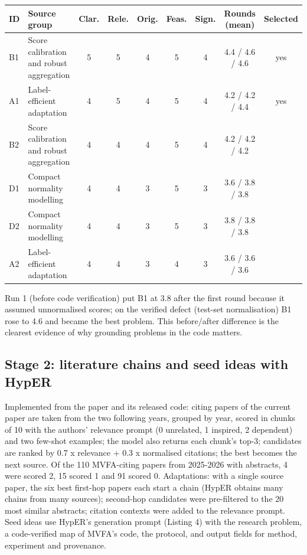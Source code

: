 \documentclass[11pt,a4paper]{article}
\begin{document}
\begin{tabularx}{\linewidth}{@{}l Y ccccc c c@{}}\toprule
ID & Source group & Clar. & Rele. & Orig. & Feas. & Sign. & Rounds (mean) & Selected\\\midrule
B1 & Score calibration and robust aggregation & 5 & 5 & 4 & 5 & 4 & 4.4 / 4.6 / 4.6 & yes\\
A1 & Label-efficient adaptation & 4 & 5 & 4 & 5 & 4 & 4.2 / 4.2 / 4.4 & yes\\
B2 & Score calibration and robust aggregation & 4 & 4 & 4 & 5 & 4 & 4.2 / 4.2 / 4.2 & \\
D1 & Compact normality modelling & 4 & 4 & 3 & 5 & 3 & 3.6 / 3.8 / 3.8 & \\
D2 & Compact normality modelling & 4 & 4 & 3 & 5 & 3 & 3.8 / 3.8 / 3.8 & \\
A2 & Label-efficient adaptation & 4 & 4 & 3 & 4 & 3 & 3.6 / 3.6 / 3.6 & \\
\bottomrule\end{tabularx}

Run 1 (before code verification) put B1 at 3.8 after the first round because it assumed unnormalised scores; on the verified defect (test-set normalisation) B1 rose to 4.6 and became the best problem. This before/after difference is the clearest evidence of why grounding problems in the code matters.
\subsection{Stage 2: literature chains and seed ideas with HypER}
Implemented from the paper and its released code: citing papers of the current paper are taken from the two following years, grouped by year, scored in chunks of 10 with the authors' relevance prompt (0 unrelated, 1 inspired, 2 dependent) and two few-shot examples; the model also returns each chunk's top-3; candidates are ranked by 0.7 x relevance + 0.3 x normalised citations; the best becomes the next source. Of the 110 MVFA-citing papers from 2025-2026 with abstracts, 4 were scored 2, 15 scored 1 and 91 scored 0. Adaptations: with a single source paper, the six best first-hop papers each start a chain (HypER obtains many chains from many sources); second-hop candidates were pre-filtered to the 20 most similar abstracts; citation contexts were added to the relevance prompt. Seed ideas use HypER's generation prompt (Listing 4) with the research problem, a code-verified map of MVFA's code, the protocol, and output fields for method, experiment and provenance.
\end{document}
